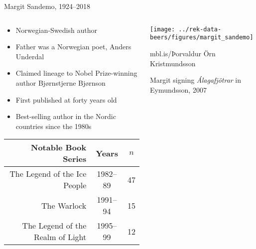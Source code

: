 \begin{frame}{Margit Sandemo, 1924--2018}
    \begin{columns}[T]
        \begin{column}{0.6\textwidth}
            \begin{itemize}
                \item Norwegian-Swedish author
                \item Father was a Norwegian poet, Anders Underdal
                \item Claimed lineage to Nobel Prize-winning author Bjørnstjerne Bjørnson
                \item First published at forty years old
                \item Best-selling author in the Nordic countries since the 1980s
            \end{itemize}
            \vfill
            \begin{scriptsize}
                \begin{table}
                    \begin{tabular}{rcc}
                        \textbf{Notable Book Series}     & \textbf{Years} & $n$ \\ \midrule
                        The Legend of the Ice People     & 1982--89       & 47  \\
                        The Warlock                      & 1991--94       & 15  \\
                        The Legend of the Realm of Light & 1995--99       & 12
                    \end{tabular}
                \end{table}
            \end{scriptsize}
        \end{column}
        \begin{column}{0.4\textwidth}
            \centering
            \texttt{[image: ../rek-data-beers/figures/margit\_sandemo]}
            \begin{tiny}
                mbl.is/Þorvaldur Örn Kristmundsson
            \end{tiny}

            \vfill
            Margit signing \emph{Álagafjötrar} in Eymundsson, 2007
        \end{column}
    \end{columns}
\end{frame}

